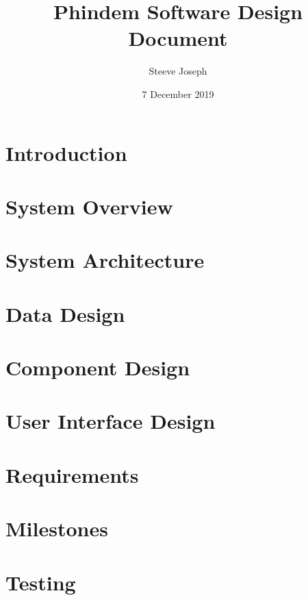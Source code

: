 \documentclass[twoside]{report}
\title{Phindem Software Design Document}
\author{Steeve Joseph}
\date{7 December 2019}
\begin{document}
\maketitle
\tableofcontents
\listoffigures
\listoftables


\chapter{Introduction}


\chapter{System Overview}


\chapter{System Architecture}


\chapter{Data Design}


\chapter{Component Design}


\chapter{User Interface Design}


\chapter{Requirements}


\chapter{Milestones}


\chapter{Testing}

\end{document}
